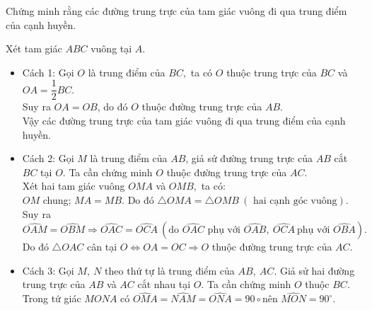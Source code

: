 \begin{vd}%
	Chứng minh rằng các đường trung trực của tam giác vuông đi qua trung điểm của cạnh huyền.
	\loigiai
	{
Xét tam giác $ABC$ vuông tại $A.$ 
\begin{center}\end{center}
\begin{itemize}
	\item Cách 1: Gọi $O$ là trung điểm của $BC,$ ta có $O$ thuộc trung trực của $BC$ và $OA=\dfrac{1}{2}BC.$ \\ Suy ra $OA=OB$,  do đó $O$ thuộc đường trung trực của $AB.$\\
	Vậy các đường trung trực của tam giác vuông đi qua trung điểm của cạnh huyền.
	\item Cách 2: Gọi $M$ là trung điểm của $AB$, giả sử đường trung trực của $AB$ cắt $BC$ tại $O.$ Ta cần chứng minh $O$ thuộc đường trung trực của $AC.$\\
	Xét hai tam giác vuông $OMA$ và $OMB,$ ta có:\\
	$OM$ chung; $MA=MB.$ Do đó $\triangle OMA=\triangle OMB\ (\mbox{\ hai cạnh góc vuông}).$\\ Suy ra $\widehat{OAM}=\widehat{OBM}\Rightarrow\widehat{OAC}=\widehat{OCA}\ (\mbox{do } \widehat{OAC}\mbox{ phụ với } \widehat{OAB},\ \widehat{OCA}\ \mbox{phụ với }\widehat{OBA}).$ Do đó $\triangle OAC$ cân tại $O\Leftrightarrow OA=OC\Rightarrow O$ thuộc đường trung trực của $AC.$
	\item  Cách 3: Gọi $M,\ N$ theo thứ tự là trung điểm của $AB,\ AC.$ Giả sử hai đường trung trực của $AB$ và $AC$ cắt nhau tại $O.$ Ta cần chứng minh $O$ thuộc $BC.$ Trong tứ giác $MONA$ có $\widehat{OMA}=\widehat{NAM}=\widehat{ONA}=90\circ$nên $\widehat{MON}=90^\circ.$\\

\end{itemize}}
\end{vd}
